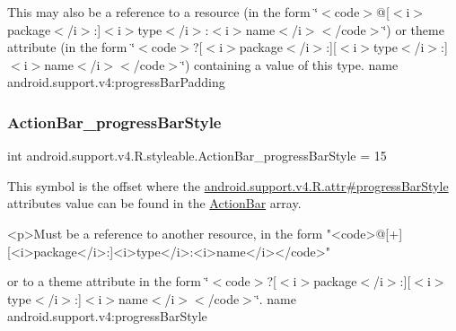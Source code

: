 This may also be a reference to a resource (in the form \char`\"{}$<$code$>$@\mbox{[}$<$i$>$package$<$/i$>$\+:\mbox{]}$<$i$>$type$<$/i$>$\+:$<$i$>$name$<$/i$>$$<$/code$>$\char`\"{}) or theme attribute (in the form \char`\"{}$<$code$>$?\mbox{[}$<$i$>$package$<$/i$>$\+:\mbox{]}\mbox{[}$<$i$>$type$<$/i$>$\+:\mbox{]}$<$i$>$name$<$/i$>$$<$/code$>$\char`\"{}) containing a value of this type.  name android.\+support.\+v4\+:progress\+Bar\+Padding \mbox{\label{classandroid_1_1support_1_1v4_1_1R_1_1styleable_a8a084dd5197bac512fb1f451fe3c4f09}} 
\subsubsection{\texorpdfstring{Action\+Bar\+\_\+progress\+Bar\+Style}{ActionBar\_progressBarStyle}}
{\footnotesize\ttfamily int android.\+support.\+v4.\+R.\+styleable.\+Action\+Bar\+\_\+progress\+Bar\+Style = 15\hspace{0.3cm}{\ttfamily [static]}}

This symbol is the offset where the \hyperlink{classandroid_1_1support_1_1v4_1_1R_1_1attr_a825836d37f82a837d7db265bcefa17d8}{android.\+support.\+v4.\+R.\+attr\#progress\+Bar\+Style} attribute\textquotesingle{}s value can be found in the \hyperlink{classandroid_1_1support_1_1v4_1_1R_1_1styleable_adc5a3492b9c46265760d7120a04d6afa}{Action\+Bar} array.

\begin{DoxyVerb}      <p>Must be a reference to another resource, in the form "<code>@[+][<i>package</i>:]<i>type</i>:<i>name</i></code>"
\end{DoxyVerb}
 or to a theme attribute in the form \char`\"{}$<$code$>$?\mbox{[}$<$i$>$package$<$/i$>$\+:\mbox{]}\mbox{[}$<$i$>$type$<$/i$>$\+:\mbox{]}$<$i$>$name$<$/i$>$$<$/code$>$\char`\"{}.  name android.\+support.\+v4\+:progress\+Bar\+Style \mbox{\label{classandroid_1_1support_1_1v4_1_1R_1_1styleable_a1738ca6c1d0d6244db6783c6990e20a8}} 
